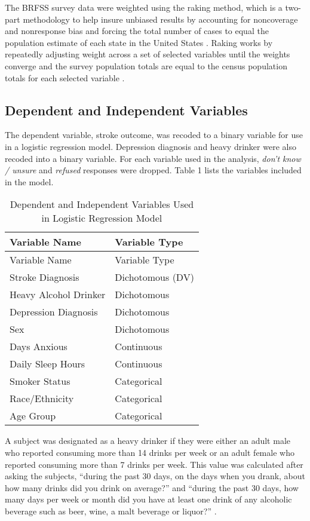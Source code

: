 \documentclass[11pt,]{article}
\begin{document}
The BRFSS survey data were weighted using the raking method, which is a
two-part methodology to help insure unbiased results by accounting for
noncoverage and nonresponse bias and forcing the total number of cases
to equal the population estimate of each state in the United States
\citep{CentersforDiseaseControlandPrevention2007a}. Raking works by
repeatedly adjusting weight across a set of selected variables until the
weights converge and the survey population totals are equal to the
census population totals for each selected variable \citep{Fricker1993}.

\hypertarget{dependent-and-independent-variables}{%
\subsection{Dependent and Independent
Variables}\label{dependent-and-independent-variables}}

The dependent variable, stroke outcome, was recoded to a binary variable
for use in a logistic regression model. Depression diagnosis and heavy
drinker were also recoded into a binary variable. For each variable used
in the analysis, \emph{don't know / unsure} and \emph{refused} responses
were dropped. Table 1 lists the variables included in the model.

\begin{longtable}[]{@{}ll@{}}
\caption{Dependent and Independent Variables Used in Logistic Regression
Model}\tabularnewline
\toprule
Variable Name & Variable Type\tabularnewline
\midrule
\endfirsthead
\toprule
Variable Name & Variable Type\tabularnewline
\midrule
\endhead
Stroke Diagnosis & Dichotomous (DV)\tabularnewline
Heavy Alcohol Drinker & Dichotomous\tabularnewline
Depression Diagnosis & Dichotomous\tabularnewline
Sex & Dichotomous\tabularnewline
Days Anxious & Continuous\tabularnewline
Daily Sleep Hours & Continuous\tabularnewline
Smoker Status & Categorical\tabularnewline
Race/Ethnicity & Categorical\tabularnewline
Age Group & Categorical\tabularnewline
\bottomrule
\end{longtable}

A subject was designated as a heavy drinker if they were either an adult
male who reported consuming more than 14 drinks per week or an adult
female who reported consuming more than 7 drinks per week. This value
was calculated after asking the subjects, ``during the past 30 days, on
the days when you drank, about how many drinks did you drink on
average?'' and ``during the past 30 days, how many days per week or
month did you have at least one drink of any alcoholic beverage such as
beer, wine, a malt beverage or liquor?''
\citep{CentersforDiseaseControlandPrevention2007}.
\end{document}
